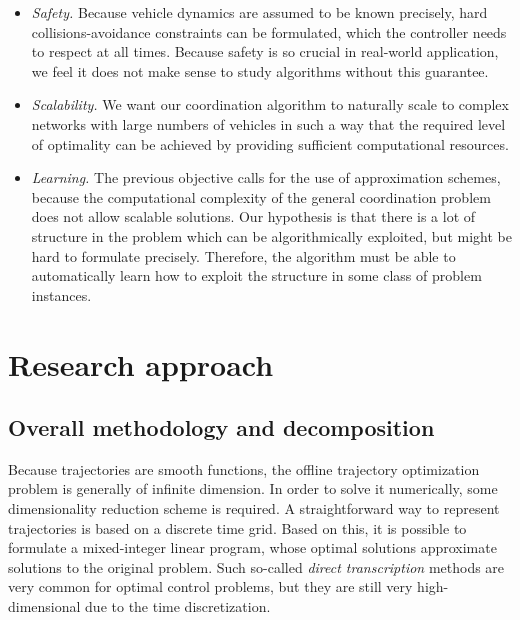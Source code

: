 \documentclass[notitlepage]{report}
\begin{document}
\begin{itemize}
  \item \textit{Safety.} Because vehicle dynamics are assumed to be known precisely, hard
        collisions-avoidance constraints can be formulated, which the controller
        needs to respect at all times. Because safety is so crucial in
        real-world application, we feel it does not make sense to study
        algorithms without this guarantee.

  \item \textit{Scalability.} We want our coordination algorithm to naturally scale
        to complex networks with large numbers of vehicles in such a way that
        the required level of optimality can be achieved by providing sufficient
        computational resources.

  \item \textit{Learning.} The previous objective calls for the use of approximation schemes,
        because the computational complexity of the general coordination problem
        does not allow scalable solutions. Our hypothesis is that there is a lot
        of structure in the problem which can be algorithmically exploited, but
        might be hard to formulate precisely. Therefore, the algorithm must be
        able to automatically learn how to exploit the structure in some class
        of problem instances.
\end{itemize}


\section*{Research approach}

\subsection*{Overall methodology and decomposition}

Because trajectories are smooth functions, the offline trajectory optimization
problem is generally of infinite dimension. In order to solve it numerically,
some dimensionality reduction scheme is required. A straightforward way to
represent trajectories is based on a discrete time grid. Based on this, it is
possible to formulate a mixed-integer linear program, whose optimal solutions
approximate solutions to the original problem. Such so-called \textit{direct
  transcription} methods are very common for optimal control problems, but they
are still very high-dimensional due to the time discretization.
\end{document}
